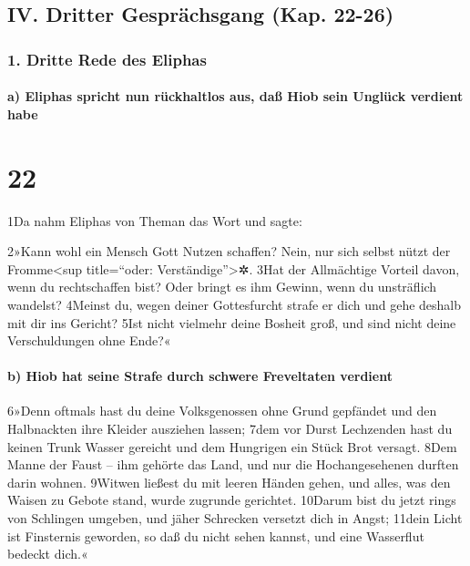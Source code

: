 \hypertarget{iv.-dritter-gespruxe4chsgang-kap.-22-26}{%
\subsection{IV. Dritter Gesprächsgang (Kap.
22-26)}\label{iv.-dritter-gespruxe4chsgang-kap.-22-26}}

\hypertarget{dritte-rede-des-eliphas}{%
\subsubsection{1. Dritte Rede des
Eliphas}\label{dritte-rede-des-eliphas}}

\hypertarget{a-eliphas-spricht-nun-ruxfcckhaltlos-aus-dauxdf-hiob-sein-ungluxfcck-verdient-habe}{%
\paragraph{a) Eliphas spricht nun rückhaltlos aus, daß Hiob sein Unglück
verdient
habe}\label{a-eliphas-spricht-nun-ruxfcckhaltlos-aus-dauxdf-hiob-sein-ungluxfcck-verdient-habe}}

\hypertarget{section-21}{%
\section{22}\label{section-21}}

1Da nahm Eliphas von Theman das Wort und sagte:

2»Kann wohl ein Mensch Gott Nutzen schaffen? Nein, nur sich selbst nützt
der Fromme\textless sup title=``oder: Verständige''\textgreater✲. 3Hat
der Allmächtige Vorteil davon, wenn du rechtschaffen bist? Oder bringt
es ihm Gewinn, wenn du unsträflich wandelst? 4Meinst du, wegen deiner
Gottesfurcht strafe er dich und gehe deshalb mit dir ins Gericht? 5Ist
nicht vielmehr deine Bosheit groß, und sind nicht deine Verschuldungen
ohne Ende?«

\hypertarget{b-hiob-hat-seine-strafe-durch-schwere-freveltaten-verdient}{%
\paragraph{b) Hiob hat seine Strafe durch schwere Freveltaten
verdient}\label{b-hiob-hat-seine-strafe-durch-schwere-freveltaten-verdient}}

6»Denn oftmals hast du deine Volksgenossen ohne Grund gepfändet und den
Halbnackten ihre Kleider ausziehen lassen; 7dem vor Durst Lechzenden
hast du keinen Trunk Wasser gereicht und dem Hungrigen ein Stück Brot
versagt. 8Dem Manne der Faust -- ihm gehörte das Land, und nur die
Hochangesehenen durften darin wohnen. 9Witwen ließest du mit leeren
Händen gehen, und alles, was den Waisen zu Gebote stand, wurde zugrunde
gerichtet. 10Darum bist du jetzt rings von Schlingen umgeben, und jäher
Schrecken versetzt dich in Angst; 11dein Licht ist Finsternis geworden,
so daß du nicht sehen kannst, und eine Wasserflut bedeckt dich.«

